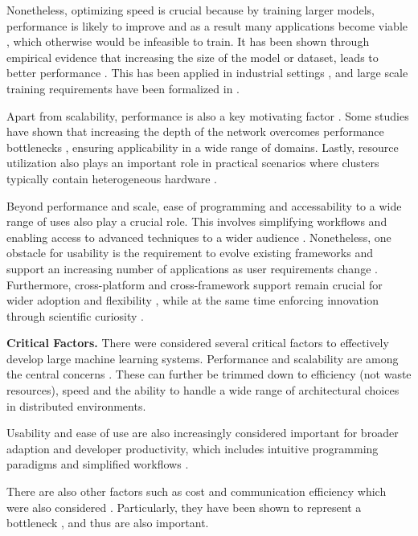 Nonetheless, optimizing speed is crucial because by training larger models, performance is likely
to improve  and as a result many applications become viable , which
otherwise would be infeasible to train.  It has been shown through empirical
evidence that increasing the size of the model or dataset, leads to better performance
. This has been applied in industrial settings , and
large scale training requirements have been formalized in .

Apart from scalability, performance is also a key motivating factor . Some
studies have shown that increasing the depth of the network overcomes performance bottlenecks
, ensuring applicability in a wide range of domains. Lastly, resource utilization
also plays an important role in practical scenarios where clusters typically contain heterogeneous
hardware .

Beyond performance and scale, ease of programming and accessability to a wide range of uses also
play a crucial role. This involves simplifying workflows and enabling access to advanced techniques
to a wider audience . Nonetheless, one obstacle for usability is the
requirement to evolve existing frameworks and support an increasing number of applications as user
requirements change . Furthermore, cross-platform and cross-framework support remain
crucial for wider adoption and flexibility , while at the same time enforcing
innovation through scientific curiosity .

\textbf{Critical Factors.}
There were considered several critical factors to effectively develop large machine learning systems.
Performance and scalability are among the central concerns . These
can further be trimmed down to efficiency (not waste resources), speed and the ability to handle
a wide range of architectural choices in distributed environments.

Usability and ease of use are also increasingly considered important for broader adaption and
developer productivity, which includes intuitive programming paradigms and simplified workflows
.

There are also other factors such as cost and communication efficiency which were also considered
. Particularly, they have been shown to represent a bottleneck ,
and thus are also important.

